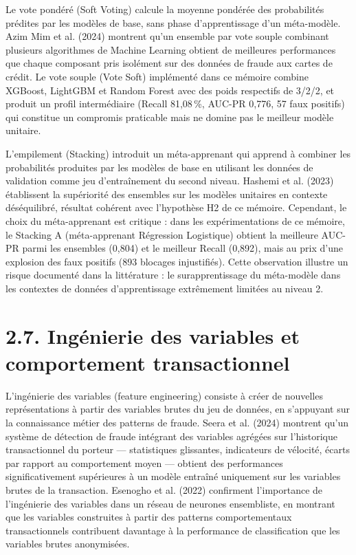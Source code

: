 Le vote pondéré (Soft Voting) calcule la moyenne pondérée des probabilités prédites par les modèles de base, sans phase d'apprentissage d'un méta-modèle. Azim Mim et al. (2024) montrent qu'un ensemble par vote souple combinant plusieurs algorithmes de Machine Learning obtient de meilleures performances que chaque composant pris isolément sur des données de fraude aux cartes de crédit. Le vote souple (Vote Soft) implémenté dans ce mémoire combine XGBoost, LightGBM et Random Forest avec des poids respectifs de 3/2/2, et produit un profil intermédiaire (Recall 81,08 \%, AUC-PR 0,776, 57 faux positifs) qui constitue un compromis praticable mais ne domine pas le meilleur modèle unitaire.

L'empilement (Stacking) introduit un méta-apprenant qui apprend à combiner les probabilités produites par les modèles de base en utilisant les données de validation comme jeu d'entraînement du second niveau. Hashemi et al. (2023) établissent la supériorité des ensembles sur les modèles unitaires en contexte déséquilibré, résultat cohérent avec l'hypothèse H2 de ce mémoire. Cependant, le choix du méta-apprenant est critique : dans les expérimentations de ce mémoire, le Stacking A (méta-apprenant Régression Logistique) obtient la meilleure AUC-PR parmi les ensembles (0,804) et le meilleur Recall (0,892), mais au prix d'une explosion des faux positifs (893 blocages injustifiés). Cette observation illustre un risque documenté dans la littérature : le surapprentissage du méta-modèle dans les contextes de données d'apprentissage extrêmement limitées au niveau 2.

\section{2.7. Ingénierie des variables et comportement transactionnel}

L'ingénierie des variables (feature engineering) consiste à créer de nouvelles représentations à partir des variables brutes du jeu de données, en s'appuyant sur la connaissance métier des patterns de fraude. Seera et al. (2024) montrent qu'un système de détection de fraude intégrant des variables agrégées sur l'historique transactionnel du porteur — statistiques glissantes, indicateurs de vélocité, écarts par rapport au comportement moyen — obtient des performances significativement supérieures à un modèle entraîné uniquement sur les variables brutes de la transaction. Esenogho et al. (2022) confirment l'importance de l'ingénierie des variables dans un réseau de neurones ensembliste, en montrant que les variables construites à partir des patterns comportementaux transactionnels contribuent davantage à la performance de classification que les variables brutes anonymisées.

